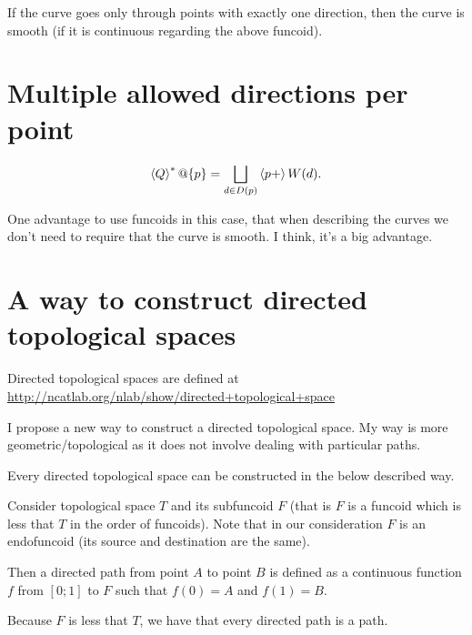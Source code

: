 \begin{conjecture}
If the curve goes only through points with exactly one direction, then the curve is smooth (if it is continuous regarding the above funcoid).
\end{conjecture}


\section{Multiple allowed directions per point}

\[ \left\langle Q\right\rangle ^{\ast}@\{p\} = \bigsqcup_{d\in D(p)} \left\langle p+\right\rangle W(d). \]

One advantage to use funcoids in this case, that when describing the curves we don't need to require that the curve is smooth. I think, it's a big advantage.

\section{A way to construct directed topological spaces}


Directed topological spaces are defined at\\
\url{http://ncatlab.org/nlab/show/directed+topological+space}

I propose a new way to construct a directed topological space. My way is more geometric/topological as it does not involve dealing with particular paths.

\begin{conjecture}
Every directed topological space can be constructed in the below described way.
\end{conjecture}

Consider topological space $T$ and its subfuncoid $F$ (that is $F$ is a funcoid which is less that $T$ in the order of funcoids).
Note that in our consideration $F$ is an endofuncoid (its source and destination are the same).

Then a directed path from point $A$ to point $B$ is defined as a continuous function $f$ from $[0;1]$ to $F$ such that $f(0)=A$ and $f(1)=B$.

Because $F$ is less that $T$, we have that every directed path is a path.

